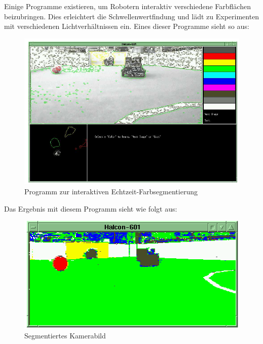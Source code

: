 \documentclass[a4paper,12pt]{article}
\begin{document}
\newpage
Einige Programme existieren, um Robotern interaktiv verschiedene Farbflächen
beizubringen. Dies erleichtert die Schwellenwertfindung und lädt zu Experimenten
mit verschiedenen Lichtverhältnissen ein. Eines dieser Programme sieht so aus:
\begin{figure}[H]
    \includegraphics[scale=0.5]{training-tool.png}
    \caption{Programm zur interaktiven Echtzeit-Farbsegmentierung}
    \label{fig:color-seg-tool}
\end{figure}

Das Ergebnis mit diesem Programm sieht wie folgt aus:
\begin{figure}[H]
    \includegraphics[scale=0.5]{segmented-view.png}
    \caption{Segmentiertes Kamerabild}
    \label{fig:color-seg-cam}
\end{figure}
\end{document}
